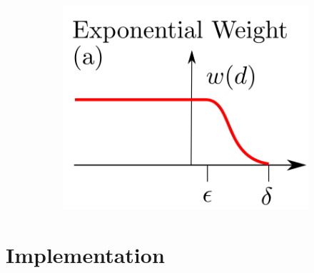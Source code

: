 \documentclass{beamer}
\begin{document}
{\begin{figure}[h]
\begin{subfigure}[h]{0.45\textwidth}
        \\
         \includegraphics[scale=0.29]{exponential_weight.png}
        \end{subfigure}
				
				

\end{figure}
}






\section{Implementation}
%
\end{document}
